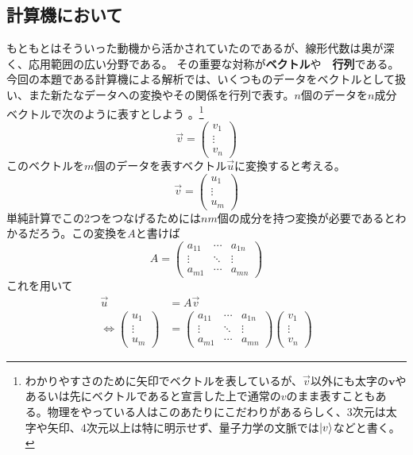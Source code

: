 \documentclass[10pt]{jsarticle}
\theoremstyle{definition}%
\newcommand{\vc}[1]{\overrightarrow{#1}}%
\newcommand{\vct}[1]{\bm{#1}}%
\numberwithin{equation}{section}%
\begin{document}
\subsection{計算機において}
もともとはそういった動機から活かされていたのであるが、線形代数は奥が深く、応用範囲の広い分野である。
その重要な対称が{\bf ベクトル}や{\bf　行列}である。
今回の本題である計算機による解析では、いくつものデータをベクトルとして扱い、また新たなデータへの変換やその関係を行列で表す。$n$個のデータを$n$成分ベクトルで次のように表すとしよう
。\footnote{わかりやすさのために矢印でベクトルを表しているが、$\vc{v}$以外にも太字の$\vct{v}$やあるいは先にベクトルであると宣言した上で通常の$v$のまま表すこともある。物理をやっている人はこのあたりにこだわりがあるらしく、3次元は太字や矢印、4次元以上は特に明示せず、量子力学の文脈では$\ket{v}$などと書く。}
\begin{equation}
  \vc{v}=\left( \begin{matrix}
    v_{1}\\
    \vdots \\
    v_{n}
  \end{matrix} \right)
\end{equation}
このベクトルを$m$個のデータを表すベクトル$\vc{u}$に変換すると考える。
\begin{equation}
  \vc{v}=\left( \begin{matrix}
    u_{1}\\
    \vdots \\
    u_{m}
  \end{matrix} \right)
\end{equation}
単純計算でこの2つをつなげるためには$nm$個の成分を持つ変換が必要であるとわかるだろう。この変換を$A$と書けば
\begin{equation}
  A=\left( \begin{matrix}
    a_{11} & \cdots & a_{1n} \\
    \vdots & \ddots & \vdots \\
    a_{m1} & \cdots & a_{mn}
  \end{matrix} \right)
\end{equation}
これを用いて
\begin{align}
  \vc{u} &= A \vc{v}\\
 \Leftrightarrow  \left( \begin{matrix}
    u_{1}\\
    \vdots \\
    u_{m}
  \end{matrix} \right)&=\left( \begin{matrix}
    a_{11} & \cdots & a_{1n} \\
    \vdots & \ddots & \vdots \\
    a_{m1} & \cdots & a_{mn}
  \end{matrix} \right)\left( \begin{matrix}
    v_{1}\\
    \vdots \\
    v_{n}
  \end{matrix} \right)
\end{align}
\end{document}
